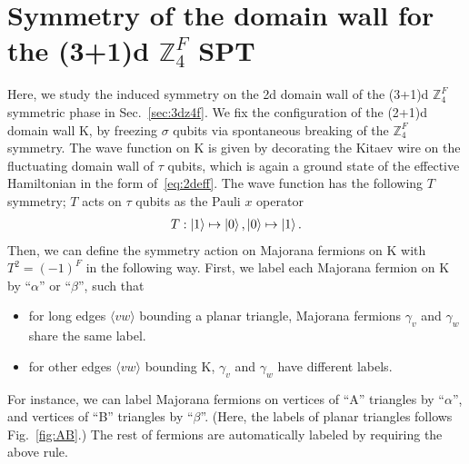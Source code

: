 \documentclass[12pt]{article}
\numberwithin{equation}{section}
\begin{document}
\section{Symmetry of the domain wall for the (3+1)d $\mathbb{Z}_4^F$ SPT}
\label{app:z4f}
Here, we study the induced symmetry on the 2d domain wall of the (3+1)d $\mathbb{Z}_4^F$ symmetric phase in Sec.~\ref{sec:3dz4f}. We fix the configuration of the (2+1)d domain wall $\mathrm{K}$, by freezing $\sigma$ qubits via spontaneous breaking of the $\mathbb{Z}_4^F$ symmetry. The wave function on $\mathrm{K}$ is given by decorating the Kitaev wire on the fluctuating domain wall of $\tau$ qubits, which is again a ground state of the effective Hamiltonian in the form of~\eqref{eq:2deff}. The wave function has the following $T$ symmetry; $T$ acts on $\tau$ qubits as the Pauli $x$ operator
\begin{align}
    T: \ket{1}\mapsto\ket{0}, \ket{0}\mapsto\ket{1}.
\end{align}
Then, we can define the symmetry action on Majorana fermions on $\mathrm{K}$ with $T^2=(-1)^F$ in the following way. First, we label each Majorana fermion on $\mathrm{K}$ by ``$\alpha$'' or ``$\beta$'', such that 
\begin{itemize}
    \item for long edges $\langle vw\rangle$ bounding a planar triangle, Majorana fermions $\gamma_v$ and $\gamma_w$ share the same label.
    \item for other edges $\langle vw\rangle$ bounding $\mathrm{K}$, $\gamma_v$ and $\gamma_w$ have different labels.
\end{itemize}
For instance, we can label Majorana fermions on vertices of ``A'' triangles by ``$\alpha$'', and vertices of ``B'' triangles by ``$\beta$''. (Here, the labels of planar triangles follows Fig.~\ref{fig:AB}.) The rest of fermions are automatically labeled by requiring the above rule. 
\end{document}

